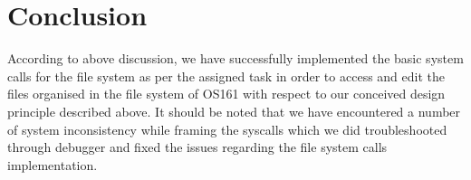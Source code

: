\documentclass[a4paper]{article}
\begin{document}
\section{Conclusion}
According to above discussion, we have successfully implemented the basic system calls for the file system as per the assigned task in order to access and edit the files organised in the file system of OS161 with respect to our conceived design principle described above. It should be noted that we have encountered a number of system inconsistency while framing the syscalls which we did troubleshooted through debugger and fixed the issues regarding the file system calls implementation. 
\end{document}

